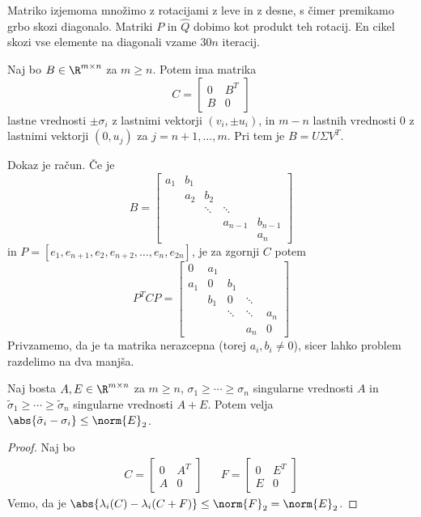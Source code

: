 Matriko izjemoma množimo z rotacijami z leve in z desne, s čimer premikamo grbo
skozi diagonalo.
Matriki $P$ in $\hat{Q}$ dobimo kot produkt teh rotacij.
En cikel skozi vse elemente na diagonali vzame $30n$ iteracij.



\begin{lema}
  Naj bo $B \in \R^{m \times n}$ za $m \ge n$.
  Potem ima matrika
  \[
	C =
	\begin{bmatrix}
	  0 & B^T \\
	  B & 0
	\end{bmatrix}
  \]
  lastne vrednosti $\pm \sigma_i$ z lastnimi vektorji $(v_i, \pm u_i)$, in $m-n$
  lastnih vrednosti $0$ z lastnimi vektorji $(0, u_j)$ za $j = n+1, \ldots, m$.
  Pri tem je $B = U \Sigma V^T$.
\end{lema}

Dokaz je račun.
Če je
\[
  B =
  \begin{bmatrix}
	a_1 & b_1 &        &        & \\
	    & a_2 & b_2    &        & \\
	    &     & \ddots & \ddots &  \\
	    &     &        & a_{n-1} & b_{n-1} \\
	    &     &        &        & a_n
  \end{bmatrix}
\]
in $P = [e_1, e_{n+1}, e_2, e_{n+2}, \ldots, e_n, e_{2n}]$, je za zgornji $C$
potem
\[
  P^T C P =
  \begin{bmatrix}
	0 & a_1 &  &  &  \\
	a_1 & 0 & b_1 &  &  \\
	  & b_1 & 0 & \ddots &  \\
	  &  & \ddots & \ddots & a_n \\
	  &  &  & a_n & 0
  \end{bmatrix}
\]
Privzamemo, da je ta matrika nerazcepna (torej $a_i, b_i \ne 0$), sicer lahko
problem razdelimo na dva manjša.

\begin{izrek}
  Naj bosta $A, E \in \R^{m \times n}$ za $m \ge n$, $\sigma_1 \ge \cdots \ge
  \sigma_n$ singularne vrednosti $A$ in $\tilde{\sigma}_1 \ge \cdots \ge
  \tilde{\sigma}_n$ singularne vrednosti $A+E$.
  Potem velja $\abs{\tilde{\sigma}_i - \sigma_i} \le \norm{E}_2$.
\end{izrek}

\begin{proof}
  Naj bo
  \begin{align*}
	C =
	\begin{bmatrix}
	  0 & A^T \\
	  A & 0
	\end{bmatrix}
	&&
	   F =
	   \begin{bmatrix}
		 0 & E^T \\
		 E & 0
	   \end{bmatrix}
  \end{align*}
  Vemo, da je $\abs{\lambda_i(C) - \lambda_i(C + F)} \le \norm{F}_2 =
  \norm{E}_2$.
\end{proof}

